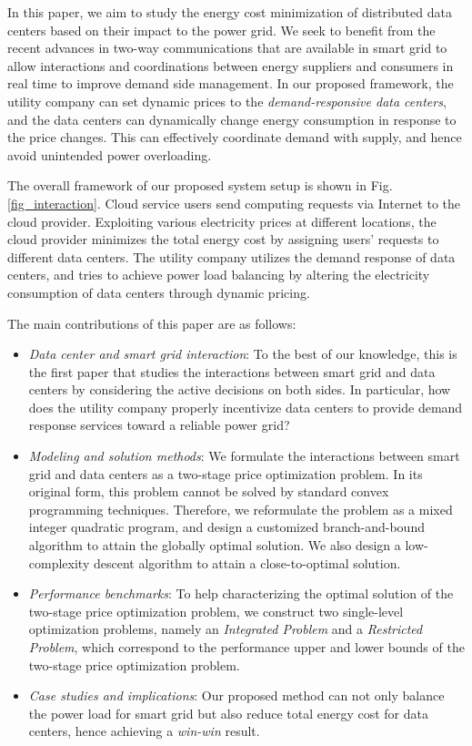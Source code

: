 \documentclass[journal]{IEEEtran}
\begin{document}
	In this paper, we aim to study the energy cost minimization of distributed data centers based on their impact to the power grid. We seek to benefit from the recent advances in two-way communications that are available in smart grid \cite{smartgrid} to allow interactions and coordinations between energy suppliers and consumers in real time to improve demand side management. In our proposed framework, the utility company can set dynamic prices to the \emph{demand-responsive data centers}, and the data centers can dynamically change energy consumption in response to the price changes. This can effectively coordinate demand with supply, and hence avoid unintended power overloading.
	
	The overall framework of our proposed system setup is shown in Fig. \ref{fig_interaction}. Cloud service users send computing requests via Internet to the cloud provider. Exploiting various electricity prices at different locations, the cloud provider minimizes the total energy cost by assigning users' requests to different data centers. The utility company utilizes the demand response of data centers, and tries to achieve power load balancing by altering the electricity consumption of data centers through dynamic pricing.
		
	The main contributions of this paper are as follows:
	\begin{itemize}
		\item \textit{Data center and smart grid interaction}: To the best of our knowledge, this is the first paper that studies the interactions between smart grid and data centers by considering the active decisions on both sides. In particular, how does the utility company properly incentivize data centers to provide demand response services toward a reliable power grid?
		\item \textit{Modeling and solution methods}: We formulate the interactions between smart grid and data centers as a two-stage price optimization problem. In its original form, this problem cannot be solved by standard convex programming techniques. Therefore, we reformulate the problem as a mixed integer quadratic program, and design a customized branch-and-bound algorithm to attain the globally optimal solution. We also design a low-complexity descent algorithm to attain a close-to-optimal solution.
		\item \textit{Performance benchmarks}: To help characterizing the optimal solution of the two-stage price optimization problem, we construct two single-level optimization problems, namely an \emph{Integrated Problem} and a \emph{Restricted Problem}, which correspond to the performance upper and lower bounds of the two-stage price optimization problem.
		\item \textit{Case studies and implications}: Our proposed method can not only balance the power load for smart grid but also reduce total energy cost for data centers, hence achieving a \emph{win-win} result. 
	\end{itemize}
	
\end{document}
